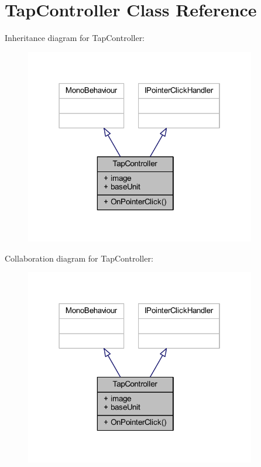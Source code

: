 \hypertarget{class_tap_controller}{}\section{Tap\+Controller Class Reference}
\label{class_tap_controller}


Inheritance diagram for Tap\+Controller\+:\nopagebreak
\begin{figure}[H]
\begin{center}
\leavevmode
\includegraphics[width=286pt]{class_tap_controller__inherit__graph}
\end{center}
\end{figure}


Collaboration diagram for Tap\+Controller\+:\nopagebreak
\begin{figure}[H]
\begin{center}
\leavevmode
\includegraphics[width=286pt]{class_tap_controller__coll__graph}
\end{center}
\end{figure}
